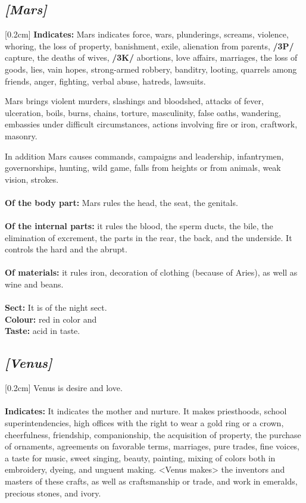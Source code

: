 \secbr
\subsection{\textit{[Mars]}}
[0.2cm]
\noindent
\textbf{Indicates:}  Mars indicates force, wars, plunderings, screams, violence, whoring, the loss of property, banishment,
exile, alienation from parents, \textbf{/3P/} capture, the deaths of wives, \textbf{/3K/} abortions, love affairs, marriages, the loss of goods, lies, vain hopes, strong-armed robbery, banditry, looting, quarrels among friends, anger,
fighting, verbal abuse, hatreds, lawsuits. 

Mars brings violent murders, slashings and bloodshed, attacks of fever, ulceration, boils, burns, chains, torture, masculinity, false oaths, wandering, embassies under difficult
circumstances, actions involving fire or iron, craftwork, masonry. 

In addition Mars causes commands, campaigns and leadership, infantrymen, governorships, hunting, wild game, falls from heights or from animals, weak vision, strokes. \\
\\
\textbf{Of the body part:} Mars rules the head, the seat, the genitals. \\
\\
\textbf{Of the internal parts:} it rules the blood, the sperm ducts, the bile, the elimination of excrement, the parts in the rear, the back, and the underside. It controls the hard and the abrupt. \\
\\
\textbf{Of materials:} it rules iron, decoration of clothing (because of Aries), as well as wine and beans. \\
\\
\textbf{Sect:} It is of the night sect. \\
\textbf{Colour:} red in color and \\
\textbf{Taste:} acid in taste.

\secbr
\subsection{\textit{[Venus]}}
[0.2cm]
 Venus is desire and love. \\
\\
\textbf{Indicates:} It indicates the mother and nurture. It makes priesthoods, school superintendencies, high offices with the right to wear a gold ring or a crown, cheerfulness, friendship, companionship, the acquisition of property, the purchase of ornaments, agreements on favorable terms, marriages, pure trades, fine voices, a taste for music, sweet singing, beauty, painting, mixing of colors both in embroidery, dyeing, and unguent making. <Venus makes> the inventors and masters of these crafts, as well as craftsmanship or trade, and work in emeralds, precious stones, and ivory. 

